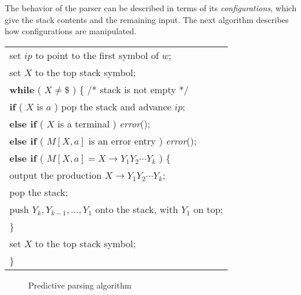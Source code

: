 \documentclass[12pt,a4paper,twoside,openany]{book}
\begin{document}
The behavior of the parser can be described in terms of its \textit{configurations}, which give the stack contents and the remaining input. The next algorithm describes how configurations are manipulated.


\begin{center}
    \begin{tabular}{l}
        set $ip$ to point to the first symbol of $w$;\\
        set $X$ to the top stack symbol;\\
        \textbf{while} ( $X\ne\mathdollar$ ) \{ /* stack is not empty */\\
        \qquad\textbf{if} ( $X$ is $a$ ) pop the stack and advance $ip$;\\
        \qquad\textbf{else if} ( $X$ is a terminal ) \textit{error}();\\
        \qquad\textbf{else if} ( $M[X,a]$ is an error entry ) \textit{error}();\\
        \qquad\textbf{else if} ( $M[X,a]=X\rightarrow Y_1Y_2\cdots Y_k$ ) \{\\
        \qquad\qquad output the production $X\rightarrow Y_1Y_2\cdots Y_k$;\\
        \qquad\qquad pop the stack;\\
        \qquad\qquad push $Y_k,Y_{k-1},\ldots,Y_1$ onto the stack, with $Y_1$ on top;\\
        \qquad \}\\
        \qquad set $X$ to the top stack symbol;\\
        \}
    \end{tabular}
\end{center}
\begin{figure}[htbp]
    \caption{Predictive parsing algorithm}
    \label{Figure:4.20}
\end{figure}
\end{document}
